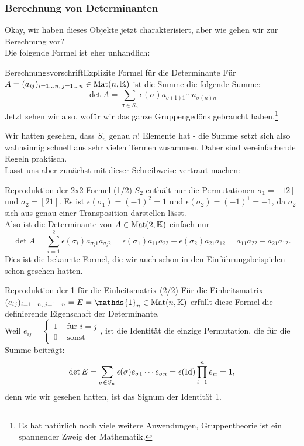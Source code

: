 \subsubsection{Berechnung von Determinanten}
Okay, wir haben dieses Objekte jetzt charakterisiert, aber wie gehen wir zur Berechnung vor?\\
Die folgende Formel ist eher unhandlich:
\begin{Satz}
{Berechnungsvorschrift}{Explizite Formel für die Determinante}
Für $A=(a_{ij})_{i=1...n,\,j=1...n}\in\text{Mat}(n,\mathbb{K})$ ist die Summe die folgende Summe:
\begin{equation}
    \det A=\sum_{\sigma\in S_n}\epsilon(\sigma)a_{\sigma(1)1}\cdots a_{\sigma(n)n}
\end{equation}
Jetzt sehen wir also, wofür wir das ganze Gruppengedöns gebraucht haben.\footnote{Es hat natürlich noch viele weitere Anwendungen, Gruppentheorie ist ein spannender Zweig der Mathematik.}
\end{Satz}
Wir hatten gesehen, dass $S_n$ genau $n!$ Elemente hat - die Summe setzt sich also wahnsinnig schnell aus sehr vielen Termen zusammen. Daher sind vereinfachende Regeln praktisch.\\
Lasst uns aber zunächst mit dieser Schreibweise vertraut machen:
\begin{Beispiel}
{Reproduktion der 2x2-Formel (1/2)}
$S_2$ enthält nur die Permutationen $\sigma_1=[12]$ und $\sigma_2=[21]$. Es ist $\epsilon(\sigma_1)=(-1)^2=1$ und $\epsilon(\sigma_2)=(-1)^1=-1$, da $\sigma_2$ sich aus genau einer Transposition darstellen lässt.\\
Also ist die Determinante von $A\in\text{Mat}(2,\mathbb{K})$ einfach nur
\begin{equation}
    \det A=\sum_{i=1}^{2}\epsilon(\sigma_i)a_{\sigma_i1}a_{\sigma_i2}=\epsilon(\sigma_1)a_{11}a_{22}+\epsilon(\sigma_2)a_{21}a_{12}=a_{11}a_{22}-a_{21}a_{12}.
\end{equation}
Dies ist die bekannte Formel, die wir auch schon in den Einführungsbeispielen schon gesehen hatten.
\begin{equation}
\end{equation}
\end{Beispiel}
\begin{Beispiel}
{Reproduktion der 1 für die Einheitsmatrix (2/2)}
Für die Einheitsmatrix $(e_{ij})_{i=1...n,\,j=1...n}=E=\mathds{1}_n\in\Met(n,\mathbb{K})$ erfüllt diese Formel die definierende Eigenschaft der Determinante.\\
Weil $e_{ij}=\begin{cases}1 &\text{ für }i=j\\0&\text{ sonst}\end{cases}$, ist die Identität die einzige Permutation, die für die Summe beiträgt:
\begin{equation*}
    \det E=\sum_{\sigma\in S_n}\epsilon(\sigma)e_{\sigma1}\cdots e_{\sigma n}=\epsilon(\text{Id})\prod_{i=1}^n e_{ii}=1,
\end{equation*}
denn wie wir gesehen hatten, ist das Signum der Identität 1.
\end{Beispiel}
